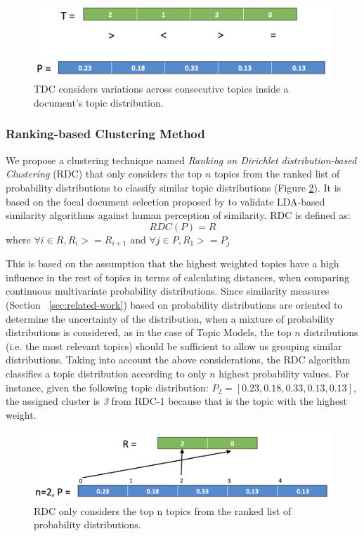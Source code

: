 \begin{figure}
  \centering
  \includegraphics[scale=0.33]{tdc-cluster.png}
  \caption{TDC considers variations across consecutive topics inside a document’s topic distribution.}
  \label{fig:tdc-cluster}
\end{figure}


\subsubsection{Ranking-based Clustering Method}

We propose a clustering technique named \textit{Ranking on Dirichlet distribution-based Clustering} (RDC) that only considers the top $n$ topics from the ranked list of probability distributions to classify similar topic distributions (Figure \ref{fig:rdc-cluster}). It is based on the focal document selection proposed by \citep{Towne2016} to validate LDA-based similarity algorithms against human perception of similarity. RDC is defined as:
\begin{equation}
RDC(P)=R
\end{equation}
where  $\forall i \in R, R_i>=R_{i+1}$ and $\forall j \in P, R_1>=P_j$

This is based on the assumption that the highest weighted topics have a high influence in the rest of topics in terms of calculating distances, when comparing continuous multivariate probability distributions. Since similarity measures (Section ~\ref{sec:related-work}) based on probability distributions are oriented to determine the uncertainty of the distribution, when a mixture of probability distributions is considered, as in the case of Topic Models, the top $n$ distributions (i.e. the most relevant topics) should be sufficient to allow us grouping similar distributions. Taking into account the above considerations, the RDC algorithm classifies a topic distribution according to only $n$ highest probability values. For instance, given the following topic distribution: $P_2=[0.23, 0.18, 0.33, 0.13, 0.13]$, the assigned cluster is \textit{3} from RDC-1 because that is the topic with the highest weight.

\begin{figure}
  \centering
  \includegraphics[scale=0.33]{rdc-cluster.png}
  \caption{RDC only considers the top n topics from the ranked list of probability distributions.}
  \label{fig:rdc-cluster}
\end{figure}


